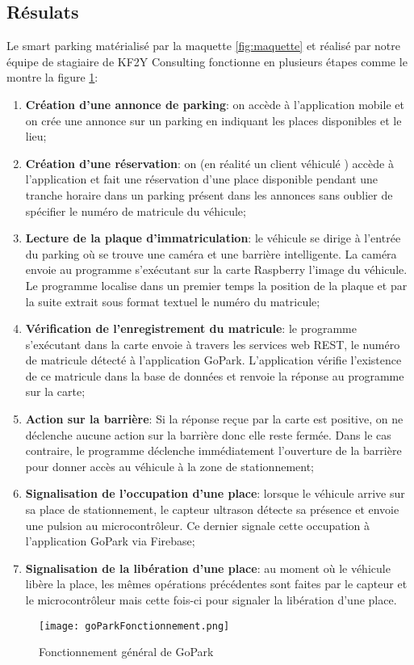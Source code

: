     \subsection{Résulats}
Le smart parking matérialisé par la maquette \ref{fig:maquette} et réalisé par notre équipe de stagiaire de KF2Y Consulting fonctionne en plusieurs étapes comme le montre la figure \ref{fig:fonctionnement}:
    \begin{enumerate}
        \item \textbf{Création d’une annonce de parking}: on accède à l’application mobile et on crée une annonce sur un parking en indiquant les places disponibles et le lieu;
        \item \textbf{Création d’une réservation}: on (en réalité un client véhiculé ) accède à l’application et fait une réservation d’une place disponible pendant une tranche horaire dans un parking présent dans les annonces sans oublier de spécifier le numéro de matricule du véhicule;
        \item \textbf{Lecture de la plaque d'immatriculation}: le véhicule se dirige à l’entrée du parking où se trouve une caméra et une barrière intelligente. La caméra envoie au programme s'exécutant sur la carte Raspberry l’image du véhicule. Le programme localise dans un premier temps la position de la plaque et par la suite extrait sous format textuel le numéro du matricule;
        \item \textbf{Vérification de l'enregistrement du matricule}: le programme s'exécutant dans la carte envoie à travers les services web REST, le numéro de matricule détecté à l’application GoPark. L’application vérifie l’existence de ce matricule dans la base de données et renvoie la réponse au programme sur la carte;
        \item \textbf{Action sur la barrière}: Si la réponse reçue par la carte est positive, on ne déclenche aucune action sur la barrière donc elle reste fermée. Dans le cas contraire, le programme déclenche immédiatement l’ouverture de la barrière pour donner accès au véhicule à la zone de stationnement;
        \item \textbf{Signalisation de l’occupation d’une place}: lorsque le véhicule arrive sur sa place de stationnement, le capteur ultrason détecte sa présence et envoie une pulsion au microcontrôleur. Ce dernier signale  cette occupation à l’application GoPark via Firebase;
        \item \textbf{Signalisation de la libération d’une place}: au moment où le véhicule libère la place, les mêmes opérations précédentes sont faites par le capteur et le microcontrôleur mais cette fois-ci pour signaler la libération d'une place.
    \end{enumerate}
    \begin{figure}
        \centering
        \texttt{[image: goParkFonctionnement.png]}
        \caption{Fonctionnement général de GoPark}
        \label{fig:fonctionnement}
    \end{figure}
    
    